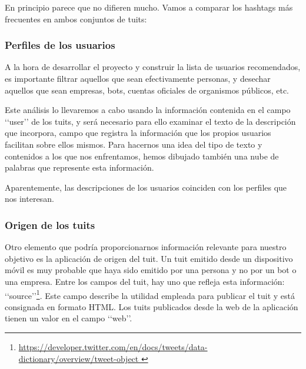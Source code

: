 En principio parece que no difieren mucho. Vamos a comparar los hashtags más frecuentes
en ambos conjuntos de tuits:


\subsubsection{Perfiles de los usuarios}
A la hora de desarrollar el proyecto y construir la lista de usuarios recomendados, es importante
filtrar aquellos que sean efectivamente personas, y desechar aquellos que sean empresas, bots, cuentas
oficiales de organismos públicos, etc.

Este análisis lo llevaremos a cabo usando la información contenida en el campo \lq\lq user\rq\rq
de los tuits, y será necesario para ello examinar el texto de la descripción que incorpora, campo que
registra la información que los propios usuarios facilitan sobre ellos mismos. 
Para hacernos una idea del tipo de texto y contenidos a los que nos enfrentamos, hemos dibujado también
una nube de palabras que represente esta información.




Aparentemente, las descripciones de los usuarios coinciden con los perfiles que nos interesan.

\subsubsection{Origen de los tuits}
\label{subsubsect:origen_tuits}
Otro elemento que podría proporcionarnos información relevante para nuestro objetivo
es la aplicación de origen del tuit. Un tuit emitido desde un dispositivo móvil es muy
probable que haya sido emitido por una persona y no por un bot o una empresa. 
Entre los campos del tuit, hay uno que refleja esta información: \lq\lq source\rq\rq\footnote{
\url{https://developer.twitter.com/en/docs/tweets/data-dictionary/overview/tweet-object }}.
Este campo describe la utilidad empleada para publicar el tuit y 
está consignada en formato HTML. Los tuits publicados desde la web
de la aplicación tienen un valor en el campo \lq\lq web\rq\rq.

